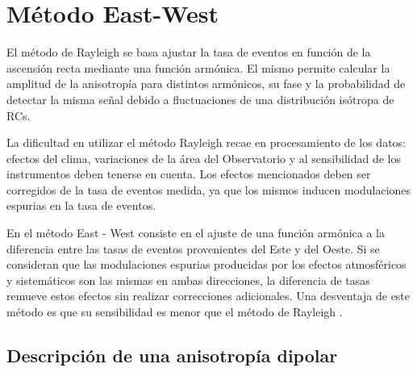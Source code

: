 
\chapter{Método East-West}

El método de Rayleigh se basa ajustar la tasa de eventos en función de la ascensión recta mediante una función armónica. El mismo permite calcular la amplitud de la anisotropía para distintos armónicos, su fase y la probabilidad de detectar la misma señal debido a fluctuaciones de una distribución isótropa de RCs. 

La dificultad en utilizar el método Rayleigh recae en procesamiento de los datos: efectos del clima,  variaciones de la área del Observatorio y al sensibilidad de los instrumentos deben tenerse en cuenta.  Los efectos mencionados deben ser corregidos de la tasa de eventos medida, ya que los mismos inducen modulaciones espurias en la tasa de eventos.

En el método East - West consiste en el ajuste de una función armónica a la diferencia entre las tasas de eventos provenientes del Este y del Oeste. Si se consideran que las modulaciones espurias producidas por los efectos atmosféricos y sistemáticos son las mismas en ambas direcciones, la diferencia de tasas remueve estos efectos sin realizar correcciones adicionales. Una desventaja de este método es que su sensibilidad es menor que el método de Rayleigh \cite{taborda}.


\section{Descripción de una anisotropía dipolar}

